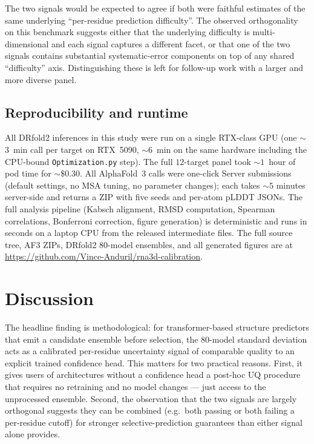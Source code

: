 \documentclass[conference,10pt]{IEEEtran}
\begin{document}
The two signals would be expected to agree if both were faithful
estimates of the same underlying ``per-residue prediction
difficulty''. The observed orthogonality on this benchmark suggests
either that the underlying difficulty is multi-dimensional and each
signal captures a different facet, or that one of the two signals
contains substantial systematic-error components on top of any
shared ``difficulty'' axis. Distinguishing these is left for
follow-up work with a larger and more diverse panel.

\subsection{Reproducibility and runtime}

All DRfold2 inferences in this study were run on a single
RTX-class GPU (one $\sim$$3$~min call per target on RTX~5090, $\sim$$6$~min
on the same hardware including the CPU-bound
\texttt{Optimization.py} step). The full $12$-target panel took
$\sim$$1$~hour of pod time for $\sim$$\$0.30$. All AlphaFold~3 calls
were one-click Server submissions (default settings, no MSA tuning,
no parameter changes); each takes $\sim$$5$ minutes server-side and
returns a ZIP with five seeds and per-atom pLDDT JSONs. The full
analysis pipeline (Kabsch alignment, RMSD computation, Spearman
correlations, Bonferroni correction, figure generation) is
deterministic and runs in seconds on a laptop CPU from the released
intermediate files. The full source tree, AF3 ZIPs, DRfold2
$80$-model ensembles, and all generated figures are at
\url{https://github.com/Vince-Anduril/rna3d-calibration}.

\section{Discussion}

The headline finding is methodological: for transformer-based
structure predictors that emit a candidate ensemble before
selection, the $80$-model standard deviation acts as a calibrated
per-residue uncertainty signal of comparable quality to an explicit
trained confidence head. This matters for two practical reasons.
First, it gives users of architectures without a confidence head a
post-hoc UQ procedure that requires no retraining and no model
changes --- just access to the unprocessed ensemble. Second, the
observation that the two signals are largely orthogonal suggests
they can be combined (e.g.\ both passing or both failing a
per-residue cutoff) for stronger selective-prediction guarantees
than either signal alone provides.
\end{document}
